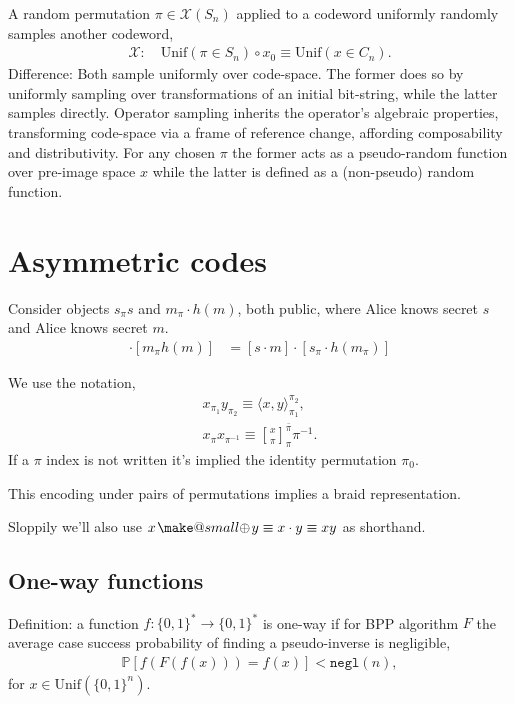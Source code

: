 \documentclass[twocolumn, aps, amsmath, amssymb, nofootinbib, superscriptaddress, longbibliography, doublefloatfix, table-of-contents, eqsecnum, rmp]{revtex4-2}
\makeatletter
\def\braid#1#2#3#4{\langle#1,#2\rangle_{#3}^{#4}}
\newcommand{\stackbraid}[2]{{\genfrac{[}{]}{0pt}{}{{#1}}{{#2}}}^{\bar{\pi}}_{\pi}}
\newcommand{\soplus}{{{\hspace{1pt}}{\mathbin{\mathpalette\make@small{\mathbin\oplus}}}}{\hspace{1pt}}}
\newcommand{\make@small}[2]{%
  \vcenter{\hbox{%
    \scalebox{0.6}{$\m@th#1#2$}%
  }}%
}
\makeatother
\begin{document}
A random permutation $\pi\in\mathcal{X}(S_n)$ applied to a codeword uniformly randomly samples another codeword,
\begin{align}
	\mathcal{X}:\quad \mathrm{Unif}(\pi\in S_n) \circ x_0 \equiv \mathrm{Unif}(x\in C_n).
\end{align}
Difference: Both sample uniformly over code-space. The former does so by uniformly sampling over transformations of an initial bit-string, while the latter samples directly. Operator sampling inherits the operator's algebraic properties, transforming code-space via a frame of reference change, affording composability and distributivity. For any chosen $\pi$ the former acts as a pseudo-random function over pre-image space $x$ while the latter is defined as a (non-pseudo) random function.

\section{Asymmetric codes}

Consider objects $s_\pi s$ and $m_\pi \cdot h(m)$, both public, where Alice knows secret $s$ and Alice knows secret $m$.
\begin{align}
	[s_\pi s] \cdot [m_\pi h(m)] &= [s \cdot m] \cdot [s_\pi \cdot h(m_\pi)]
\end{align}

We use the notation,
\begin{align}
	x_{\pi_1} y_{\pi_2} \equiv \braid{x}{y}{\pi_1}{\pi_2},\nonumber\\
	x_{\pi} x_{\pi^{-1}} \equiv \stackbraid{x}{\pi}{\pi^{-1}}.
\end{align}
If a $\pi$ index is not written it's implied the identity permutation $\pi_0$.

This encoding under pairs of permutations implies a braid representation.

Sloppily we'll also use $x\soplus y \equiv x \cdot y \equiv xy$ as shorthand.

\subsection{One-way functions}

Definition: a function $f:\{0,1\}^* \to \{0,1\}^*$ is one-way if for BPP algorithm $F$ the average case success probability of finding a pseudo-inverse is negligible,
\begin{align}
	\mathbb{P}[f(F(f(x))) = f(x)] < \mathtt{negl}(n),
\end{align}
for $x\in\mathrm{Unif}(\{0,1\}^n)$.
\end{document}
